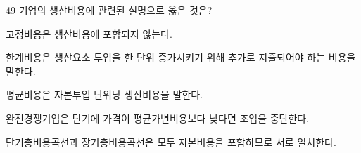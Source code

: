 \begin{question}{49}
기업의 생산비용에 관련된 설명으로 옳은 것은?
\begin{choices}
  \item 고정비용은 생산비용에 포함되지 않는다.
  \item 한계비용은 생산요소 투입을 한 단위 증가시키기 위해 추가로 지출되어야 하는 비용을 말한다.
  \item 평균비용은 자본투입 단위당 생산비용을 말한다.
  \item 완전경쟁기업은 단기에 가격이 평균가변비용보다 낮다면 조업을 중단한다.
  \item 단기총비용곡선과 장기총비용곡선은 모두 자본비용을 포함하므로 서로 일치한다.
\end{choices}
\end{question}

